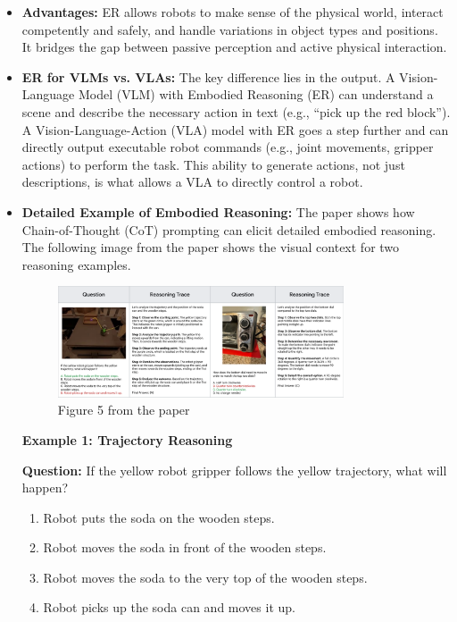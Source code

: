 \documentclass[12pt,a4paper]{article}
\begin{document}
\begin{itemize}
    \item \textbf{Advantages:} ER allows robots to make sense of the physical world, interact competently and safely, and handle variations in object types and positions. It bridges the gap between passive perception and active physical interaction.

    \item \textbf{ER for VLMs vs. VLAs:} The key difference lies in the output. A Vision-Language Model (VLM) with Embodied Reasoning (ER) can understand a scene and describe the necessary action in text (e.g., ``pick up the red block''). A Vision-Language-Action (VLA) model with ER goes a step further and can directly output executable robot commands (e.g., joint movements, gripper actions) to perform the task. This ability to generate actions, not just descriptions, is what allows a VLA to directly control a robot.

    \item \textbf{Detailed Example of Embodied Reasoning:} The paper shows how Chain-of-Thought (CoT) prompting can elicit detailed embodied reasoning. The following image from the paper shows the visual context for two reasoning examples.

    \begin{figure}[h]
        \centering
        \includegraphics[width=0.8\textwidth]{../reading/source-paper/images/x5.png}
        \caption{Figure 5 from the paper}
        \label{fig:reasoning-examples}
    \end{figure}

    \textbf{Example 1: Trajectory Reasoning}

    \textbf{Question:} If the yellow robot gripper follows the yellow trajectory, what will happen?
    \begin{enumerate}[label=\Alph*.]
        \item Robot puts the soda on the wooden steps.
        \item Robot moves the soda in front of the wooden steps.
        \item Robot moves the soda to the very top of the wooden steps.
        \item Robot picks up the soda can and moves it up.
    \end{enumerate}


\end{itemize}
\end{document}
